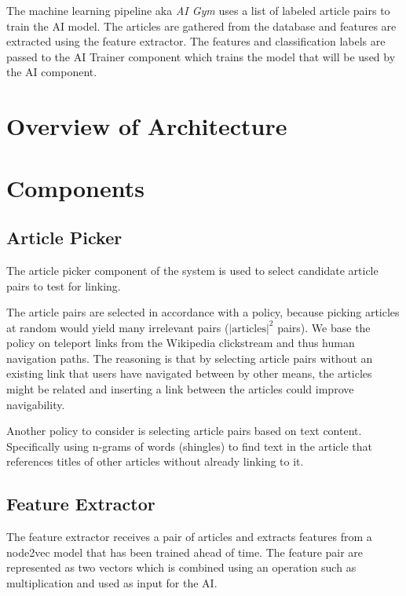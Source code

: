 The machine learning pipeline aka \textit{AI Gym\texttrademark} uses a list of labeled article pairs to train the AI model. The articles are gathered from the database and features are extracted using the feature extractor. The features and classification labels are passed to the AI Trainer component which trains the model that will be used by the AI component.


\section{Overview of Architecture}\label{sec:architecture}

\section{Components}

\subsection{Article Picker}
The article picker component of the system is used to select candidate article pairs to test for linking.

The article pairs are selected in accordance with a policy, because picking articles at random would yield many irrelevant pairs ($\left\vert{\text{articles}}\right\vert ^{2}$ pairs). We base the policy on teleport links from the Wikipedia clickstream and thus human navigation paths. The reasoning is that by selecting article pairs without an existing link that users have navigated between by other means, the articles might be related and inserting a link between the articles could improve navigability.

Another policy to consider is selecting article pairs based on text content. Specifically using n-grams of words (shingles) to find text in the article that references titles of other articles without already linking to it. 


\subsection{Feature Extractor}
The feature extractor receives a pair of articles and extracts features from a node2vec model that has been trained ahead of time. The feature pair are represented as two vectors which is combined using an operation such as multiplication  and used as input for the AI.



